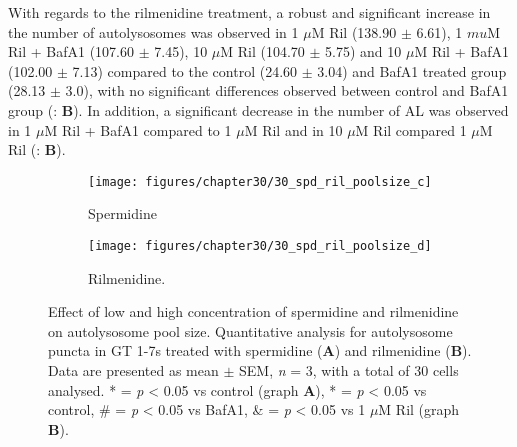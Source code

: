 {With regards to the rilmenidine treatment, a robust and significant increase in the number of autolysosomes was observed in 1 $\mu$M Ril (138.90 $\pm$ 6.61), 1 $mu$M Ril + BafA1 (107.60 $\pm$ 7.45), 10 $\mu$M Ril (104.70 $\pm$ 5.75) and 10 $\mu$M Ril + BafA1 (102.00 $\pm$ 7.13) compared to the control (24.60 $\pm$ 3.04) and BafA1 treated group (28.13 $\pm$ 3.0), with no significant differences observed between control and BafA1 group (: \textbf{B}). In addition, a significant decrease in the number of AL was observed in 1 $\mu$M Ril + BafA1 compared to 1 $\mu$M Ril and in 10 $\mu$M Ril compared 1 $\mu$M Ril (: \textbf{B}).

\begin{figure}[!htbp]
  \begin{subfigure}[b]{0.495\linewidth}
    \texttt{[image: figures/chapter30/30\_spd\_ril\_poolsize\_c]}
    \caption{Spermidine}
  \end{subfigure}
  \begin{subfigure}[b]{0.495\linewidth}
    \texttt{[image: figures/chapter30/30\_spd\_ril\_poolsize\_d]}
    \caption{Rilmenidine.}
  \end{subfigure}
  \caption[Effect of low and high concentration of spermidine and rilmenidine on autolysosome pool size]{Effect of low and high concentration of spermidine and rilmenidine on autolysosome pool size. Quantitative analysis for autolysosome puncta in GT 1-7s treated with spermidine (\textbf{A}) and rilmenidine (\textbf{B}). Data are presented as mean $\pm$ SEM, \textit{n} = 3, with a total of 30 cells analysed. * = \textit{p} < 0.05 vs control (graph \textbf{A}), * = \textit{p} < 0.05 vs control, \# = \textit{p} < 0.05 vs BafA1, \& = \textit{p} < 0.05 vs 1 $\mu$M Ril (graph \textbf{B}).}
  \label{fig:30_spd_ril_poolsize2}
\end{figure}

}
